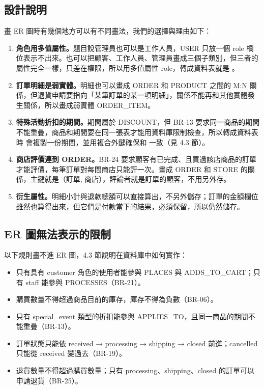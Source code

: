 \subsection{設計說明}

畫 ER 圖時有幾個地方可以有不同畫法，我們的選擇與理由如下：

\begin{enumerate}
  \item \textbf{角色用多值屬性。}題目說管理員也可以是工作人員，USER 只放一個 role 欄位表示不出來。也可以把顧客、工作人員、管理員畫成三個子類別，但三者的屬性完全一樣，只差在權限，所以用多值屬性 role，轉成資料表就是 。
  \item \textbf{訂單明細是弱實體。}明細也可以畫成 ORDER 和 PRODUCT 之間的 M:N 關係，但退貨申請要指向「某筆訂單的某一項明細」，關係不能再和其他實體發生關係，所以畫成弱實體 ORDER\_ITEM。
  \item \textbf{特殊活動折扣的期間。}期間屬於 DISCOUNT，但 BR-13 要求同一商品的期間不能重疊，商品和期間要在同一張表才能用資料庫限制檢查，所以轉成資料表時  會複製一份期間，並用複合外鍵確保和  一致（見 4.3 節）。
  \item \textbf{商店評價連到 ORDER。}BR-24 要求顧客有已完成、且買過該店商品的訂單才能評價，每筆訂單對每間商店只能評一次。畫成 ORDER 和 STORE 的關係，主鍵就是（訂單, 商店），評論者就是訂單的顧客，不用另外存。
  \item \textbf{衍生屬性。}明細小計與退款總額可以直接算出，不另外儲存；訂單的金額欄位雖然也算得出來，但它們是付款當下的結果，必須保留，所以仍然儲存。
\end{enumerate}

\subsection{ER 圖無法表示的限制}

以下規則畫不進 ER 圖，4.3 節說明在資料庫中如何實作：

\begin{itemize}
  \item 只有具有 customer 角色的使用者能參與 PLACES 與 ADDS\_TO\_CART；只有 staff 能參與 PROCESSES（BR-21）。
  \item 購買數量不得超過商品目前的庫存，庫存不得為負數（BR-06）。
  \item 只有 special\_event 類型的折扣能參與 APPLIES\_TO，且同一商品的期間不能重疊（BR-13）。
  \item 訂單狀態只能依 received → processing → shipping → closed 前進；cancelled 只能從 received 變過去（BR-19）。
  \item 退貨數量不得超過購買數量；只有 processing、shipping、closed 的訂單可以申請退貨（BR-25）。
\end{itemize}

